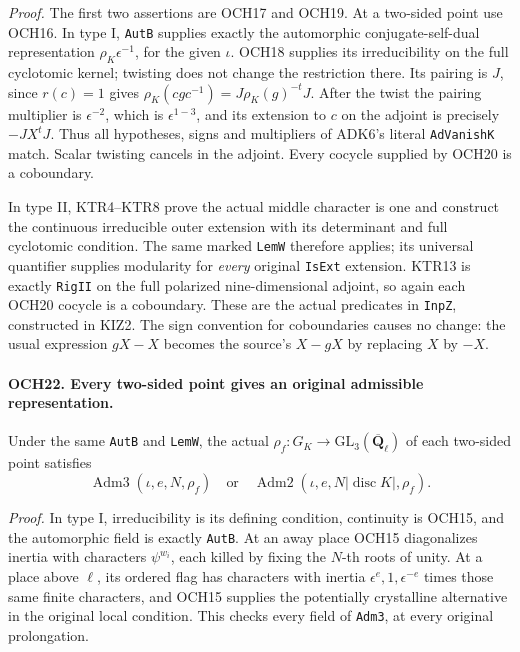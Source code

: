 \documentclass[11pt,a4paper]{article}
\numberwithin{equation}{section}
\theoremstyle{remark}\newtheorem{remark}[theorem]{Remark}
\begin{document}
\emph{Proof.}
The first two assertions are OCH17 and OCH19.  At a two-sided
point use OCH16.  In type I, \texttt{Aut\allowbreak B} supplies exactly the
automorphic conjugate-self-dual representation
\(\rho_K\epsilon^{-1}\), for the given \(\iota\).
OCH18 supplies its irreducibility on the full cyclotomic kernel;
twisting does not change the restriction there.  Its pairing is
\(J\), since \(r(c)=1\) gives
\(\rho_K(cgc^{-1})=J\rho_K(g)^{-t}J\).
After the twist the pairing multiplier is \(\epsilon^{-2}\),
which is \(\epsilon^{1-3}\), and its extension to \(c\)
on the adjoint is precisely \(-JX^tJ\).
Thus all hypotheses, signs and multipliers of ADK6's literal
\texttt{Ad\allowbreak Vanish\allowbreak K} match.  Scalar twisting cancels in the
adjoint.  Every cocycle supplied by OCH20 is a coboundary.

In type II, KTR4--KTR8 prove the actual middle character is one
and construct the continuous irreducible outer extension with
its determinant and full cyclotomic condition.  The same marked
\texttt{Lem\allowbreak W} therefore applies; its universal quantifier supplies
modularity for \emph{every} original \texttt{Is\allowbreak Ext} extension.
KTR13 is exactly \texttt{Rig\allowbreak II} on the full polarized
nine-dimensional adjoint, so again each OCH20 cocycle is a
coboundary.  These are the actual predicates in \texttt{Inp\allowbreak Z},
constructed in KIZ2.  The sign convention for coboundaries causes
no change: the usual expression \(gX-X\) becomes the source's
\(X-gX\) by replacing \(X\) by \(-X\).

\paragraph{OCH22. Every two-sided point gives an original admissible representation.}
\label{claim:OCH22}
Under the same \texttt{Aut\allowbreak B} and \texttt{Lem\allowbreak W}, the actual
\(\rho_f:G_K\to\mathrm{GL}_3(\overline{\mathbf Q}_\ell)\)
of each two-sided point satisfies
\[
       \operatorname{Adm3}(\iota,e,N,\rho_f)
       \quad\text{or}\quad
       \operatorname{Adm2}(\iota,e,N|\operatorname{disc}K|,\rho_f).
 \tag{OCH.13}
\]

\emph{Proof.}
In type I, irreducibility is its defining condition, continuity
is OCH15, and the automorphic field is exactly \texttt{Aut\allowbreak B}.
At an away place OCH15 diagonalizes inertia with characters
\(\psi^{w_i}\), each killed by fixing the \(N\)-th roots
of unity.  At a place above \(\ell\), its ordered flag has
characters with inertia
\(\epsilon^{e},1,\epsilon^{-e}\) times those same finite
characters, and OCH15 supplies the potentially crystalline
alternative in the original local condition.  This checks every
field of \texttt{Adm3}, at every original prolongation.
\end{document}
